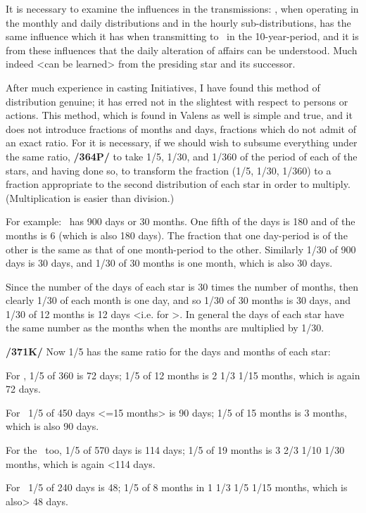 It is necessary to examine the influences in the transmissions: \Mars, when operating in the monthly and daily distributions and in the hourly sub-distributions, has the same influence which it has when transmitting to \Mercury\, in the 10-year-period, and it is from these influences that the daily alteration of affairs can be understood. Much indeed <can be learned> from the presiding star and its successor.

After much experience in casting Initiatives, I have found this method of distribution genuine; it has erred not in the slightest with respect to persons or actions. This method, which is found in Valens as well is simple and true, and it does not introduce fractions of months and days, fractions which do not admit of an exact ratio. For it is necessary, if we should wish to subsume everything under the same ratio, \textbf{/364P/} to take 1/5, 1/30, and 1/360 of the period of each of the stars, and having done so, to transform the
fraction (1/5, 1/30, 1/360) to a fraction appropriate to the second distribution of each star in order to multiply. (Multiplication is easier than division.) 

For example: \Saturn\, has 900 days or 30 months. One fifth of the days is 180 and of the months is 6 (which is also 180 days). The fraction that one day-period is of the other is the same as that of one month-period to the other. Similarly 1/30 of 900 days is 30 days, and 1/30 of 30 months is one month, which is also 30 days.

Since the number of the days of each star is 30 times the number of months, then clearly 1/30 of each month is one day, and so 1/30 of 30 months is 30 days, and 1/30 of 12 months is 12 days <i.e. for \Jupiter>. In general the days of each star have the same number as the months when the months are multiplied by 1/30.

\textbf{/371K/} Now 1/5 has the same ratio for the days and months of each star: 

For \Jupiter, 1/5 of 360 is 72 days; 1/5 of 12 months is 2 1/3 1/15 months, which is again 72 days. 

For \Mars\, 1/5 of 450 days <=15 months> is 90 days; 1/5 of 15 months is 3 months, which is also 90 days.

For the \Sun\, too, 1/5 of 570 days is 114 days; 1/5 of 19 months is 3 2/3 1/10 1/30 months, which is again <114 days.

For \Venus\, 1/5 of 240 days is 48; 1/5 of 8 months in 1 1/3 1/5 1/15 months, which is also> 48 days.

